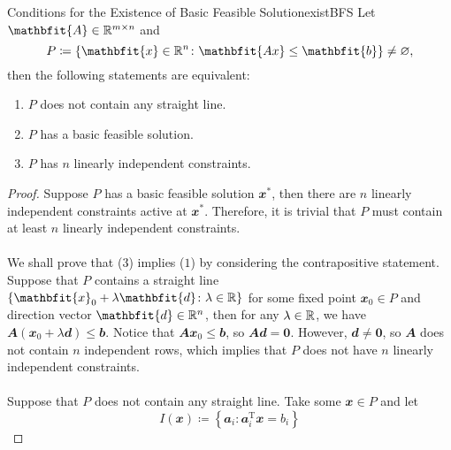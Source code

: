 \documentclass[math, code]{amznotes}
\theoremstyle{remark}
\begin{document}
\begin{thmbox}{Conditions for the Existence of Basic Feasible Solution}{existBFS}
    Let $\mathbfit{A} \in \R^{m \times n}$ and 
    \begin{equation*}
        P \coloneqq \left\{\mathbfit{x} \in \R^n \colon \mathbfit{Ax} \leq \mathbfit{b}\right\} \neq \varnothing,
    \end{equation*}
    then the following statements are equivalent:
    \begin{enumerate}
        \item $P$ does not contain any straight line.
        \item $P$ has a basic feasible solution.
        \item $P$ has $n$ linearly independent constraints.
    \end{enumerate}
    \tcblower
    \begin{proof}
        Suppose $P$ has a basic feasible solution $\mathbfit{x}^*$, then there are $n$ linearly independent constraints active at $\mathbfit{x}^*$. Therefore, it is trivial that $P$ must contain at least $n$ linearly independent constraints.
        \\\\
        We shall prove that ($3$) implies ($1$) by considering the contrapositive statement. Suppose that $P$ contains a straight line $\left\{\mathbfit{x}_0 + \lambda\mathbfit{d} \colon \lambda \in \R\right\}$ for some fixed point $\mathbfit{x}_0 \in P$ and direction vector $\mathbfit{d} \in \R^n$, then for any $\lambda \in \mathbb{R}$, we have $\mathbfit{A}(\mathbfit{x}_0 + \lambda\mathbfit{d}) \leq \mathbfit{b}$. Notice that $\mathbfit{Ax}_0 \leq \mathbfit{b}$, so $\mathbfit{Ad} = \mathbf{0}$. However, $\mathbfit{d} \neq \mathbf{0}$, so $\mathbfit{A}$ does not contain $n$ independent rows, which implies that $P$ does not have $n$ linearly independent constraints.
        \\\\
        Suppose that $P$ does not contain any straight line. Take some $\mathbfit{x} \in P$ and let 
        \begin{equation*}
            I(\mathbfit{x}) \coloneqq \left\{\mathbfit{a}_i \colon \mathbfit{a}_i^{\mathrm{T}}\mathbfit{x} = b_i\right\}
        \end{equation*}

\end{proof}
\end{thmbox}
\end{document}
